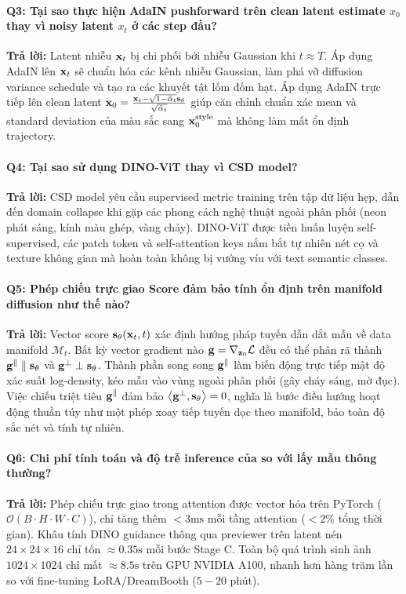 \documentclass[runningheads]{llncs}
\begin{document}
\paragraph{Q3: Tại sao thực hiện AdaIN pushforward trên clean latent estimate $x_0$ thay vì noisy latent $x_t$ ở các step đầu?}
\textbf{Trả lời:} Latent nhiễu $\mathbf{x}_t$ bị chi phối bởi nhiễu Gaussian khi $t \approx T$. Áp dụng AdaIN lên $\mathbf{x}_t$ sẽ chuẩn hóa các kênh nhiễu Gaussian, làm phá vỡ diffusion variance schedule và tạo ra các khuyết tật lốm đốm hạt. Áp dụng AdaIN trực tiếp lên clean latent $\mathbf{x}_0 = \frac{\mathbf{x}_t - \sqrt{1-\bar{\alpha}_t}\mathbf{s}_\theta}{\sqrt{\bar{\alpha}_t}}$ giúp căn chỉnh chuẩn xác mean và standard deviation của màu sắc sang $\mathbf{x}_0^{\text{style}}$ mà không làm mất ổn định trajectory.

\paragraph{Q4: Tại sao sử dụng DINO-ViT thay vì CSD model?}
\textbf{Trả lời:} CSD model yêu cầu supervised metric training trên tập dữ liệu hẹp, dẫn đến domain collapse khi gặp các phong cách nghệ thuật ngoài phân phối (neon phát sáng, kính màu ghép, vàng chảy). DINO-ViT được tiền huấn luyện self-supervised, các patch token và self-attention keys nắm bắt tự nhiên nét cọ và texture không gian mà hoàn toàn không bị vướng víu với text semantic classes.

\paragraph{Q5: Phép chiếu trực giao Score đảm bảo tính ổn định trên manifold diffusion như thế nào?}
\textbf{Trả lời:} Vector score $\mathbf{s}_\theta(\mathbf{x}_t, t)$ xác định hướng pháp tuyến dẫn dắt mẫu về data manifold $\mathcal{M}_t$. Bất kỳ vector gradient nào $\mathbf{g} = \nabla_{\mathbf{z}_0} \mathcal{L}$ đều có thể phân rã thành $\mathbf{g}^\parallel \parallel \mathbf{s}_\theta$ và $\mathbf{g}^\perp \perp \mathbf{s}_\theta$. Thành phần song song $\mathbf{g}^\parallel$ làm biến động trực tiếp mật độ xác suất log-density, kéo mẫu vào vùng ngoài phân phối (gây cháy sáng, mờ đục). Việc chiếu triệt tiêu $\mathbf{g}^\parallel$ đảm bảo $\left\langle \mathbf{g}^\perp, \mathbf{s}_\theta \right\rangle = 0$, nghĩa là bước điều hướng hoạt động thuần túy như một phép xoay tiếp tuyến dọc theo manifold, bảo toàn độ sắc nét và tính tự nhiên.

\paragraph{Q6: Chi phí tính toán và độ trễ inference của \method so với lấy mẫu thông thường?}
\textbf{Trả lời:} Phép chiếu trực giao trong attention được vector hóa trên PyTorch ($\mathcal{O}(B \cdot H \cdot W \cdot C)$), chỉ tăng thêm $< 3\text{ms}$ mỗi tầng attention ($< 2\%$ tổng thời gian). Khâu tính DINO guidance thông qua previewer trên latent nén $24 \times 24 \times 16$ chỉ tốn $\approx 0.35\text{s}$ mỗi bước Stage C. Toàn bộ quá trình sinh ảnh $1024 \times 1024$ chỉ mất $\approx 8.5\text{s}$ trên GPU NVIDIA A100, nhanh hơn hàng trăm lần so với fine-tuning LoRA/DreamBooth ($5 - 20$ phút).
\end{document}
